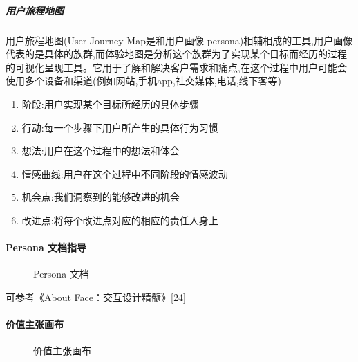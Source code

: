 \documentclass[letterpaper,11pt,english]{sphinxmanual}
\begin{document}
\subparagraph{用户旅程地图}
\label{\detokenize{chapter_knowledge/users_analysis:id18}}
用户旅程地图(User Journey Map是和用户画像
persona)相辅相成的工具,用户画像代表的是具体的族群,而体验地图是分析这个族群为了实现某个目标而经历的过程的可视化呈现工具。它用于了解和解决客户需求和痛点,在这个过程中用户可能会使用多个设备和渠道(例如网站,手机app,社交媒体,电话,线下客等)
\begin{enumerate}
%
\item {} 
阶段:用户实现某个目标所经历的具体步骤

\item {} 
行动:每一个步骤下用户所产生的具体行为习惯

\item {} 
想法:用户在这个过程中的想法和体会

\item {} 
情感曲线:用户在这个过程中不同阶段的情感波动

\item {} 
机会点:我们洞察到的能够改进的机会

\item {} 
改进点:将每个改进点对应的相应的责任人身上

\end{enumerate}


\paragraph{Persona 文档指导}
\label{\detokenize{chapter_knowledge/users_analysis:persona}}
\begin{figure}[H]
\centering
\capstart

\noindent{}
\caption{Persona 文档}\label{\detokenize{chapter_knowledge/users_analysis:id39}}\end{figure}

可参考《About Face：交互设计精髓》{[}24{]}


\paragraph{价值主张画布}
\label{\detokenize{chapter_knowledge/users_analysis:id19}}
\begin{figure}[H]
\centering
\capstart

\noindent{}
\caption{价值主张画布}\label{\detokenize{chapter_knowledge/users_analysis:id40}}\end{figure}
\end{document}
